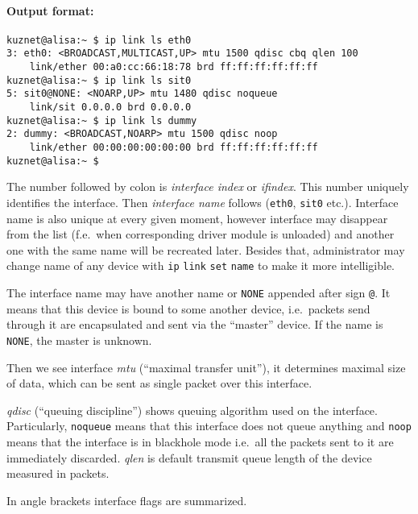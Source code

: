 \paragraph{Output format:}

\begin{verbatim}
kuznet@alisa:~ $ ip link ls eth0
3: eth0: <BROADCAST,MULTICAST,UP> mtu 1500 qdisc cbq qlen 100
    link/ether 00:a0:cc:66:18:78 brd ff:ff:ff:ff:ff:ff
kuznet@alisa:~ $ ip link ls sit0
5: sit0@NONE: <NOARP,UP> mtu 1480 qdisc noqueue
    link/sit 0.0.0.0 brd 0.0.0.0
kuznet@alisa:~ $ ip link ls dummy
2: dummy: <BROADCAST,NOARP> mtu 1500 qdisc noop
    link/ether 00:00:00:00:00:00 brd ff:ff:ff:ff:ff:ff
kuznet@alisa:~ $ 
\end{verbatim}


The number followed by colon is {\em interface index\/} or {\em ifindex\/}.
This number uniquely identifies the interface. Then {\em interface name\/}
follows (\verb|eth0|, \verb|sit0| etc.). Interface name is also
unique at every given moment, however interface may disappear from the
list (f.e.\ when corresponding driver module is unloaded) and another
one with the same name will be recreated later. Besides that,
administrator may change name of any device with
\verb|ip| \verb|link| \verb|set| \verb|name|
to make it more intelligible.

The interface name may have another name or \verb|NONE| appended 
after sign \verb|@|. It means that this device is bound to some another
device,
i.e.\ packets send through it are encapsulated and sent via the ``master''
device. If the name is \verb|NONE|, the master is unknown.

Then we see interface {\em mtu\/} (``maximal transfer unit''), it determines
maximal size of data, which can be sent as single packet over this interface.

{\em qdisc\/} (``queuing discipline'') shows queuing algorithm used
on the interface. Particularly, \verb|noqueue| means that this interface
does not queue anything and \verb|noop| means that the interface is in blackhole
mode i.e.\ all the packets sent to it are immediately discarded.
{\em qlen\/} is default transmit queue length of the device measured
in packets.

In angle brackets interface flags are summarized.

